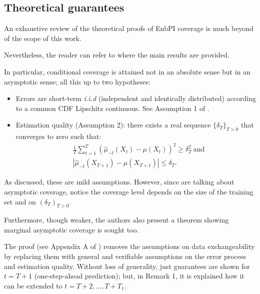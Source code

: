 \subsection{Theoretical guarantees}\label{subsec:enbpi-guarantees}

An exhaustive review of the theoretical proofs of EnbPI coverage is much beyond of the scope of this work.

Nevertheless, the reader can refer to \cite{chenxu2021b} where the main results are provided.

In particular, conditional coverage is attained not in an absolute sense but in an asymptotic sense; all this up to two hypotheses:
\begin{itemize}
    \item Errors are short-term \textit{i.i.d} (independent and identically distributed) according to a common CDF Lipschitz continuous. See Assumption 1 of \cite{chenxu2021b}.
    \item Estimation quality (Assumption 2): there exists a real sequence $\{\delta_T\}_{T>0}$ that converges to zero such that:
    \begin{align*}
        & \frac{1}{T} \sum_{t=1}^T\left(\hat{\mu}_{-t}\left(X_t\right)-\mu\left(X_t\right)\right)^2\geq \delta_T^2\ \mathrm{ and } \\ 
        & \left|\hat{\mu}_{-t}\left(X_{T+1}\right)-\mu \left(X_{T+1}\right)\right| \leq \delta_T.
    \end{align*}
\end{itemize}

As discussed, these are mild assumptions. However, since are talking about asymptotic coverage, notice the coverage level depends on the size of the training set and on $\left(\delta_T\right)_{T>0}$. 

Furthermore, though weaker, the authors also present a theorem showing marginal asymptotic coverage is sought too. 

The proof (see Appendix A of \cite{chenxu2021b}) removes the assumptions on data exchangeability by replacing them with general and verifiable assumptions on the error process and estimation quality. Without loss of generality, just guarantees are shown for $t = T +1$ (one-step-ahead prediction); but, in Remark 1, it is explained how it can be extended to $t = T +2,\ldots,T+T_1$.